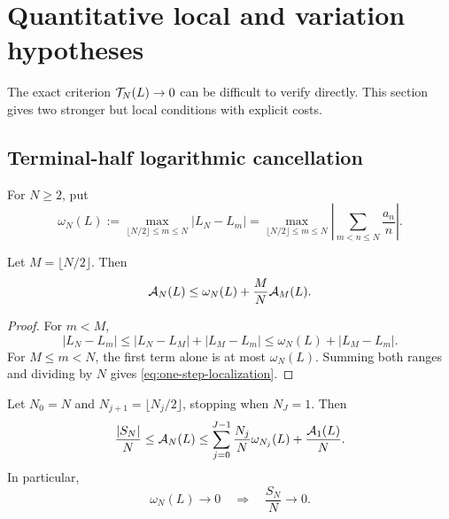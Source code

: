 \section{Quantitative local and variation hypotheses}
\label{sec:local-variation}

The exact criterion \(\mathcal T_N(L)\to0\) can be difficult to verify
directly.  This section gives two stronger but local conditions with
explicit costs.

\subsection{Terminal-half logarithmic cancellation}

\begin{definition}
\label{def:terminal-modulus}
For \(N\ge2\), put
\begin{equation}
 \omega_N(L):=
 \max_{\lfloor N/2\rfloor\le m\le N}|L_N-L_m|
 =
 \max_{\lfloor N/2\rfloor\le m\le N}
 \left|\sum_{m<n\le N}\frac{a_n}{n}\right|.
\label{eq:terminal-modulus}
\end{equation}
\end{definition}

\begin{lemma}
\label{lem:one-step-localization}
Let \(M=\lfloor N/2\rfloor\).  Then
\begin{equation}
 \mathcal A_N(L)\le
 \omega_N(L)+\frac{M}{N}\mathcal A_M(L).
\label{eq:one-step-localization}
\end{equation}
\end{lemma}

\begin{proof}
For \(m<M\),
\[
 |L_N-L_m|
 \le |L_N-L_M|+|L_M-L_m|
 \le\omega_N(L)+|L_M-L_m|.
\]
For \(M\le m<N\), the first term alone is at most
\(\omega_N(L)\).  Summing both ranges and dividing by \(N\) gives
\eqref{eq:one-step-localization}.
\end{proof}

\begin{theorem}
\label{thm:local-to-global}
Let \(N_0=N\) and \(N_{j+1}=\lfloor N_j/2\rfloor\), stopping when
\(N_J=1\).  Then
\begin{equation}
 \frac{|S_N|}{N}
 \le\mathcal A_N(L)
 \le
 \sum_{j=0}^{J-1}\frac{N_j}{N}\omega_{N_j}(L)
 +\frac{\mathcal A_1(L)}{N}.
\label{eq:geometric-local-global}
\end{equation}
In particular,
\begin{equation}
 \omega_N(L)\longrightarrow0
 \quad\Longrightarrow\quad
 \frac{S_N}{N}\longrightarrow0.
\label{eq:slow-oscillation-sufficient}
\end{equation}
\end{theorem}

